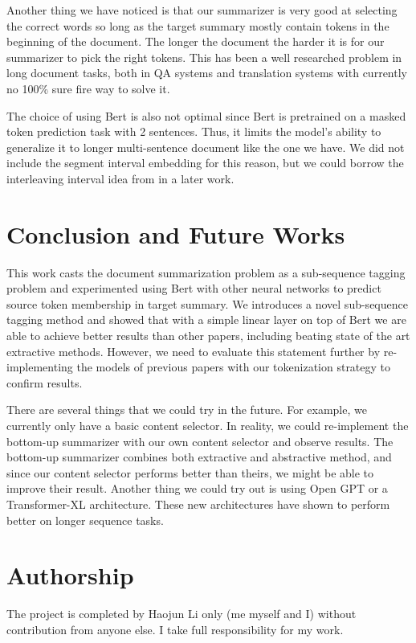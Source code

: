 \documentclass[11pt,a4paper]{article}
\begin{document}
Another thing we have noticed is that our summarizer is very good at selecting the correct words so long as the target summary mostly contain tokens in the beginning of the document. The longer the document the harder it is for our summarizer to pick the right tokens. This has been a well researched problem in long document tasks, both in QA systems and translation systems with currently no 100\% sure fire way to solve it. 

The choice of using Bert is also not optimal since Bert is pretrained on a masked token prediction task with 2 sentences. Thus, it limits the model's ability to generalize it to longer multi-sentence document like the one we have. We did not include the segment interval embedding for this reason, but we could borrow the interleaving interval idea from \citet{bert-sum} in a later work.

\section{Conclusion and Future Works}
This work casts the document summarization problem as a sub-sequence tagging problem and experimented using Bert with other neural networks to predict source token membership in target summary. We introduces a novel sub-sequence tagging method and showed that with a simple linear layer on top of Bert we are able to achieve better results than other papers, including beating state of the art extractive methods. However, we need to evaluate this statement further by re-implementing the models of previous papers with our tokenization strategy to confirm results. 

There are several things that we could try in the future. For example, we currently only have a basic content selector. In reality, we could re-implement the bottom-up summarizer \cite{bottom-up} with our own content selector and observe results. The bottom-up summarizer combines both extractive and abstractive method, and since our content selector performs better than theirs, we might be able to improve their result. Another thing we could try out is using Open GPT or a Transformer-XL architecture. These new architectures have shown to perform better on longer sequence tasks.

\section{Authorship}
The project is completed by Haojun Li only (me myself and I) without contribution from anyone else. I take full responsibility for my work.

\newpage


\end{document}
